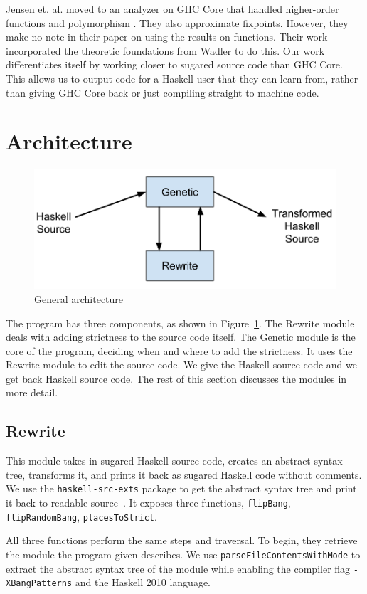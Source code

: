 \documentclass[preprint,nocopyrightspace]{sigplanconf}
\begin{document}
Jensen et. al. moved to an analyzer on GHC Core that handled higher-order functions and polymorphism \cite{jensen}. They also approximate fixpoints. However, they make no note in their paper on using the results on functions. Their work incorporated the theoretic foundations from Wadler\cite{wadler} to do this. Our work differentiates itself by working closer to sugared source code than GHC Core. This allows us to output code for a Haskell user that they can learn from, rather than giving GHC Core back or just compiling straight to machine code.

\section{Architecture}\label{sec:arch}
\begin{figure}[t]
\includegraphics[width=\columnwidth]{modules.png}
\caption{General architecture}
\label{fig:arch}
\end{figure}
The program has three components, as shown in Figure~\ref{fig:arch}. The Rewrite module deals with adding strictness to the source code itself. The Genetic module is the core of the program, deciding when and where to add the strictness. It uses the Rewrite module to edit the source code. We give the Haskell source code and we get back Haskell source code. The rest of this section discusses the modules in more detail.
\subsection{Rewrite}
This module takes in sugared Haskell source code, creates an abstract syntax tree, transforms it, and prints it back as sugared Haskell code without comments. We use the \lstinline!haskell-src-exts! package to get the abstract syntax tree and print it back to readable source~\cite{hsrcext}. It exposes three functions, \lstinline!flipBang!, \lstinline!flipRandomBang!, \lstinline!placesToStrict!.

All three functions perform the same steps and traversal. To begin, they retrieve the module the program given describes. We use \lstinline!parseFileContentsWithMode! to extract the abstract syntax tree of the module while enabling the compiler flag \lstinline!-XBangPatterns! and the Haskell 2010 language. 
\end{document}
